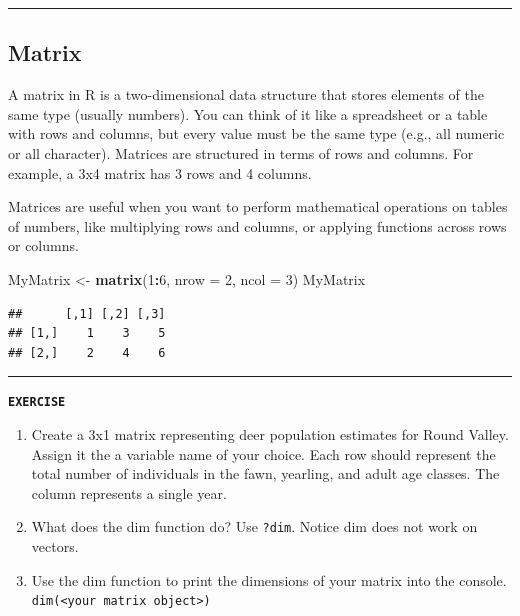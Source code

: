 \documentclass[
]{book}
\newenvironment{Shaded}{\begin{snugshade}}{\end{snugshade}}
\newcommand{\AttributeTok}[1]{\textcolor[rgb]{0.13,0.29,0.53}{#1}}
\newcommand{\DecValTok}[1]{\textcolor[rgb]{0.00,0.00,0.81}{#1}}
\newcommand{\FunctionTok}[1]{\textcolor[rgb]{0.13,0.29,0.53}{\textbf{#1}}}
\newcommand{\NormalTok}[1]{#1}
\newcommand{\OtherTok}[1]{\textcolor[rgb]{0.56,0.35,0.01}{#1}}
\newcommand{\SpecialCharTok}[1]{\textcolor[rgb]{0.81,0.36,0.00}{\textbf{#1}}}
\providecommand{\tightlist}{%
  \setlength{\itemsep}{0pt}\setlength{\parskip}{0pt}}
\begin{document}
\begin{center}\rule{0.5\linewidth}{0.5pt}\end{center}

\subsection{Matrix}\label{matrix}

A matrix in R is a two-dimensional data structure that stores elements of the same type (usually numbers). You can think of it like a spreadsheet or a table with rows and columns, but every value must be the same type (e.g., all numeric or all character). Matrices are structured in terms of rows and columns. For example, a 3x4 matrix has 3 rows and 4 columns.

Matrices are useful when you want to perform mathematical operations on tables of numbers, like multiplying rows and columns, or applying functions across rows or columns.

\begin{Shaded}
\begin{Highlighting}[]
\NormalTok{MyMatrix }\OtherTok{\textless{}{-}} \FunctionTok{matrix}\NormalTok{(}\DecValTok{1}\SpecialCharTok{:}\DecValTok{6}\NormalTok{, }\AttributeTok{nrow =} \DecValTok{2}\NormalTok{, }\AttributeTok{ncol =} \DecValTok{3}\NormalTok{)}
\NormalTok{MyMatrix}
\end{Highlighting}
\end{Shaded}

\begin{verbatim}
##      [,1] [,2] [,3]
## [1,]    1    3    5
## [2,]    2    4    6
\end{verbatim}

\begin{center}\rule{0.5\linewidth}{0.5pt}\end{center}

\textbf{\texttt{EXERCISE}}

\begin{enumerate}
\def\labelenumi{\arabic{enumi}.}
\tightlist
\item
  Create a 3x1 matrix representing deer population estimates for Round Valley. Assign it the a variable name of your choice.
  Each row should represent the total number of individuals in the fawn, yearling, and adult age classes. The column represents a single year.
\item
  What does the dim function do? Use \texttt{?dim}. Notice dim does not work on vectors.
\item
  Use the dim function to print the dimensions of your matrix into the console. \texttt{dim(\textless{}your\ matrix\ object\textgreater{})}
\end{enumerate}
\end{document}
